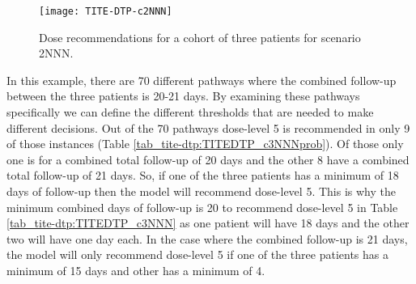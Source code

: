 \begin{figure}[H]
	\centering
	\caption{Dose recommendations for a cohort of three patients for scenario 2NNN.}
	\label{fig_tite-dtp:c2NNNprob}
	\texttt{[image: TITE-DTP-c2NNN]}
\end{figure}

In this example, there are 70 different pathways where the combined follow-up between the three patients is 20-21 days. By examining these pathways specifically we can define the different thresholds that are needed to make different decisions. Out of the 70 pathways dose-level 5 is recommended in only 9 of those instances (Table \ref{tab_tite-dtp:TITEDTP_c3NNNprob}). Of those only one is for a combined total follow-up of 20 days and the other 8 have a combined total follow-up of 21 days. So, if one of the three patients has a minimum of 18 days of follow-up then the model will recommend dose-level 5. This is why the minimum combined days of follow-up is 20 to recommend dose-level 5 in Table \ref{tab_tite-dtp:TITEDTP_c3NNN} as one patient will have 18 days and the other two will have one day each. In the case where the combined follow-up is 21 days, the model will only recommend dose-level 5 if one of the three patients has a minimum of 15 days and other has a minimum of 4. 


